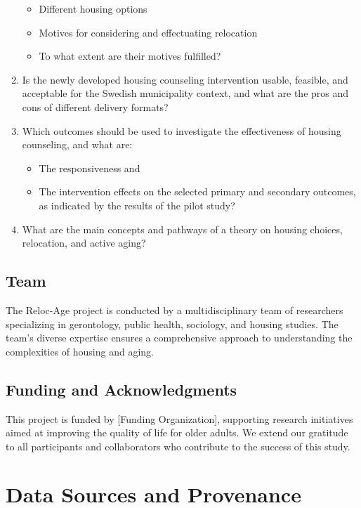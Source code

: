 \documentclass[
]{book}
\begin{document}
\begin{enumerate}
  \begin{itemize}
  \item
    Different housing options
  \item
    Motives for considering and effectuating relocation
  \item
    To what extent are their motives fulfilled?
  \end{itemize}
\item
  Is the newly developed housing counseling intervention usable, feasible, and acceptable for the Swedish municipality context, and what are the pros and cons of different delivery formats?
\item
  Which outcomes should be used to investigate the effectiveness of housing counseling, and what are:

  \begin{itemize}
  \item
    The responsiveness and
  \item
    The intervention effects on the selected primary and secondary outcomes, as indicated by the results of the pilot study?
  \end{itemize}
\item
  What are the main concepts and pathways of a theory on housing choices, relocation, and active aging?
\end{enumerate}

\hypertarget{team}{%
\section{Team}\label{team}}

The Reloc-Age project is conducted by a multidisciplinary team of researchers specializing in gerontology, public health, sociology, and housing studies. The team's diverse expertise ensures a comprehensive approach to understanding the complexities of housing and aging.

\hypertarget{funding-and-acknowledgments}{%
\section{Funding and Acknowledgments}\label{funding-and-acknowledgments}}

This project is funded by {[}Funding Organization{]}, supporting research initiatives aimed at improving the quality of life for older adults. We extend our gratitude to all participants and collaborators who contribute to the success of this study.

\hypertarget{data-sources-and-provenance}{%
\chapter{Data Sources and Provenance}\label{data-sources-and-provenance}}
\end{document}
